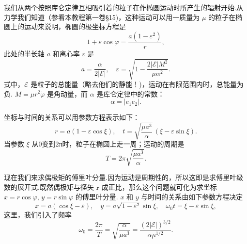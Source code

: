 我们从两个按照库仑定律互相吸引着的粒子在作椭圆运动时所产生的辐射开始.从力学我们知道（参看本教程第一卷§15)，这种运动可以用一质量为 $\mu$ 的粒子在椭圆上的运动来说明，椭圆的极坐标方程是
\begin{equation}
  1+\varepsilon\cos\varphi=\frac{a(1-\varepsilon^2)}{r},
\end{equation}
此处的半长轴 $a$ 和离心率 $\varepsilon$ 是
\begin{equation}
  a=\frac{\alpha}{2|\mathcal{E}|},\quad
  \varepsilon=\sqrt{1-\frac{2|\mathcal{E}|M^2}{\mu\alpha^2}}.
\end{equation}
式中，$\mathcal{E}$ 是粒子的总能量（略去他们的静能！)，运动在有限范围内时，总能量为负. $M=\mu r^2\dot{\varphi}$ 是角动量，而 $\alpha$ 是库仑定律中的常数：
\begin{equation*}
  \alpha=|e_1e_2|.
\end{equation*}

坐标与时间的关系可以用参数方程表示如下：
\begin{equation}
  r=a(1-\varepsilon\cos\xi),\quad
  t=\sqrt{\frac{\mu a^3}{\alpha}}\,(\xi-\varepsilon\sin\xi).
\end{equation}
当参数 $\xi$ 从0变到2π时，粒子在椭圆上走一周；运动的周期是
\begin{equation*}
  T=2\pi\sqrt{\frac{\mu a^3}{\alpha}}.
\end{equation*}

现在我们来求偶极矩的傅里叶分量.因为运动是周期性的，所以这即是求傅里叶级数的展开式.既然偶极矩与径矢 $\boldsymbol{r}$ 成正比，那么这个问题就可化为求坐标 $x=r\cos\varphi$, $y=r\sin\varphi$ 的傅里叶分量. $x$ 和 $y$ 与时间的关系由如下参数方程决定
\begin{equation}
  x=a(\cos\xi-\varepsilon),\quad
  y=a\sqrt{1-\varepsilon^2}\sin\xi,\quad
  \omega_0t=\xi-\varepsilon\sin\xi,
\end{equation}
这里，我们引入了频率
\begin{equation*}
  \omega_0=\frac{2\pi}{T}=\sqrt{\frac{\alpha}{\mu a^3}}=\frac{(2|\mathcal{E}|)^{3/2}}{\alpha\mu^{1/2}}.
\end{equation*}

